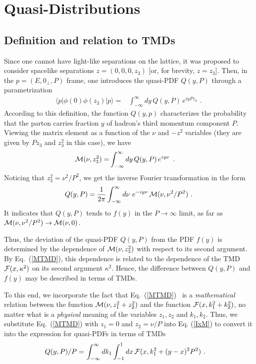 \section{Quasi-Distributions}

\subsection{Definition and relation to TMDs}

Since one cannot have light-like separations on the lattice,
it was proposed \cite{Ji:2013dva} to consider
spacelike separations
$z= (0,0,0,z_3)$ [or, for brevity, \mbox{$z=z_3$}]. Then,
in the \mbox{$p=(E, 0_\perp, P)$} frame,
one introduces the quasi-PDF $Q(y, P)$ through a parametrization
\begin{align}
\langle p |   \phi(0) \phi (z_3)|p \rangle
=  &
\int_{-\infty}^{\infty}   dy \,
Q(y, P) \,  e^{i y  P z_3 } \,
\  .
\label{newVDFxzQ}
\end{align}
According to this definition, the function $Q(y,p)$ characterizes the probability
that the parton carries fraction $y$ of hadron's third momentum
component $P$. Viewing the matrix element as a function
of the $\nu$ and $-z^2$ variables
(they are given by $Pz_3$ and $z_3^2$ in this case), we have
\begin{align}
{\cal M} (\nu,z_3^2)
=  &
\int_{-\infty}^{\infty}   dy \,
Q(y, P) \,  e^{i y  \nu } \,
\  .
\end{align}
Noticing that $z_3^2= \nu^2/P^2$, we get the inverse Fourier transformation
in the form
\begin{align}
Q(y,  P)   =\frac{1}{2 \pi}  \int_{-\infty}^{\infty}  d\nu \,
\, e^{-i y  \nu}  \, {\cal M} (\nu,  \nu^2/P^2)    \  .
\label{IxM}
\end{align}
It
indicates that $Q(y,  P)$ tends to $f(y)$ in the
$P \to \infty$ limit, as far as ${\cal M} (\nu,  \nu^2/P^2) \to {\cal M} (\nu, 0)$.

Thus, the deviation of the quasi-PDF $Q(y,  P)$ from the PDF $f(y)$
is determined by the dependence of ${\cal M} (\nu,  z_3^2)$
with respect to its second argument.
By \mbox{Eq. (\ref{MTMD}),} this dependence is related to the dependence
of the TMD ${\cal F} (x, \kappa^2)$ on its second argument $\kappa^2$.
Hence, the difference between $Q(y,  P)$ and $f(y)$
may be described in terms of TMDs.

To this end, we
incorporate the fact that \mbox{Eq. (\ref{MTMD}) }
is a {\it mathematical} relation between
the function \mbox{${\cal M} (\nu,  z_1^2+z_2^2) $}
and the function ${\cal F} (x, k_1^2+k_2^2)$,
no matter what is a {\it physical} meaning of the variables
$z_1,z_2$ and $k_1,k_2$.
Thus, we
substitute \mbox{Eq. (\ref{MTMD})} with $z_1=0$ and $z_2 =\nu/P$
into Eq. (\ref{IxM}) to convert it into the
expression for quasi-PDFs in terms of TMDs
\begin{align}
Q(y, P) /P =  & \,\int_{-\infty}^{\infty} d  k_1
\int_{-1} ^ {1} d  x \,   {\cal F} (x, k_1^2+(y-x)^2P^2 )
\  .
\label{QTMD}
\end{align}

